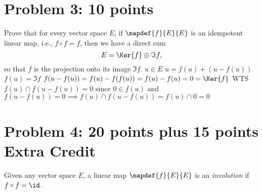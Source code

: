 \documentclass[12pt]{article}
\begin{document}
\section*{Problem 3: 10 points}
\label{prob-5.2}
Prove that 
for every vector space $E$, if $\mapdef{f}{E}{E}$ is an idempotent
linear map, i.e., $f\circ f = f$, then we have a direct sum
\[
E = \Ker{f} \oplus \Im{f},
\]
so that $f$ is the projection onto its image $\Im{f}$.
\newline $u \in E$
\newline $u=f(u) + (u - f(u))$
\newline $f(u)= \Im {f}$
\newline $f(u-f(u))=f(u)-f(f(u))=f(u)-f(u)=0=\Ker{f}$
\newline WTS $f(u) \cap f(u-f(u))=0$
\newline since $0 \in f(u)$ and $f(u-f(u))=0 \implies f(u) \cap f(u-f(u))=f(u) \cap 0=0$


\section*{Problem 4: 20 points plus 15 points Extra Credit}
\label{prob-5.5}
Given any vector space $E$, a linear map  $\mapdef{f}{E}{E}$  is an
{\it involution\/} if  $f\circ f = \id$.
\end{document}

